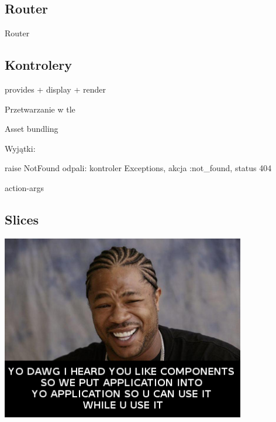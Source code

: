 \documentclass[19pt]{beamer}
\begin{document}
\begin{center}
\begin{frame}
\begin{itemize}
\end{itemize}

\end{frame}

\subsection{Router}

\begin{frame}
Router


\end{frame}

\subsection{Kontrolery}

\begin{frame}
provides + display + render


\end{frame}

\begin{frame}
Przetwarzanie w tle


\end{frame}

\begin{frame}
Asset bundling


\end{frame}

\begin{frame}
Wyjątki:

raise NotFound odpali: kontroler Exceptions, akcja :not\_found, status 404
\end{frame}

\begin{frame}
action-args


\end{frame}

\subsection{Slices}

\begin{frame}
\includegraphics[width=0.8\textwidth]{dawg.png} 
\end{frame}


\end{center}
\end{document}
